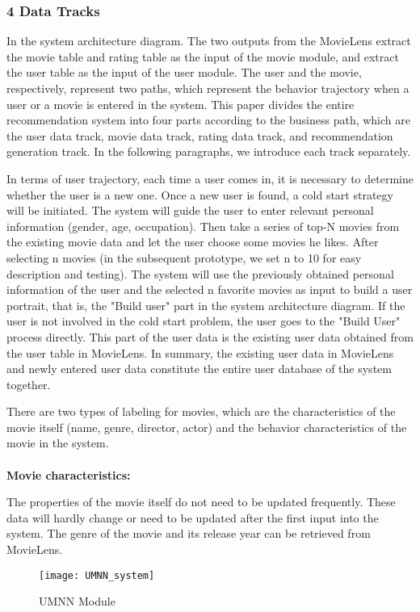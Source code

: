 \subsubsection{4 Data Tracks}
In the system architecture diagram. The two outputs from the MovieLens extract the movie table and rating table as the input of the movie module, and extract the user table as the input of the user module. The user and the movie, respectively, represent two paths, which represent the behavior trajectory when a user or a movie is entered in the system. This paper divides the entire recommendation system into four parts according to the business path, which are the user data track, movie data track, rating data track, and recommendation generation track. In the following paragraphs, we introduce each track separately.
\par In terms of user trajectory, each time a user comes in, it is necessary to determine whether the user is a new one. Once a new user is found, a cold start strategy will be initiated. The system will guide the user to enter relevant personal information (gender, age, occupation). Then take a series of top-N movies from the existing movie data and let the user choose some movies he likes. After selecting n movies (in the subsequent prototype, we set n to 10 for easy description and testing). The system will use the previously obtained personal information of the user and the selected n favorite movies as input to build a user portrait, that is, the "Build user" part in the system architecture diagram. If the user is not involved in the cold start problem, the user goes to the "Build User" process directly. This part of the user data is the existing user data obtained from the user table in MovieLens. In summary, the existing user data in MovieLens and newly entered user data constitute the entire user database of the system together.
\par There are two types of labeling for movies, which are the characteristics of the movie itself (name, genre, director, actor) and the behavior characteristics of the movie in the system.
\\
\\
\textbf{Movie characteristics:}
\par The properties of the movie itself do not need to be updated frequently. These data will hardly change or need to be updated after the first input into the system. The genre of the movie and its release year can be retrieved from MovieLens.
\begin{figure}[h]
\caption{UMNN Module}
\centering
\texttt{[image: UMNN\_system]}
\end{figure}
